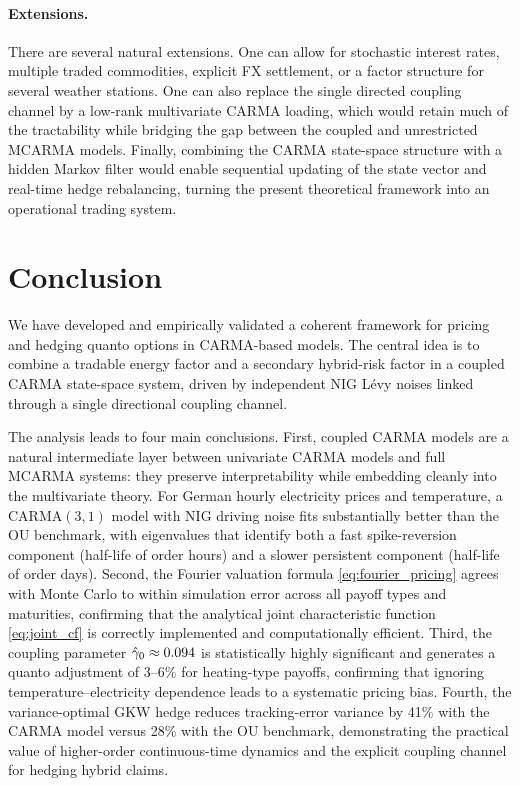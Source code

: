 \documentclass[10pt,a4paper,reqno]{amsart}
\newcommand{\tbd}[1]{\textup{#1}}
\newcommand{\1}{\mathbbm{1}}
\begin{document}
\paragraph{Extensions.}
There are several natural extensions. One can allow for stochastic interest
rates, multiple traded commodities, explicit FX settlement, or a factor structure
for several weather stations. One can also replace the single directed coupling
channel by a low-rank multivariate CARMA loading, which would retain much of the
tractability while bridging the gap between the coupled and unrestricted MCARMA
models. Finally, combining the CARMA state-space structure with a hidden Markov
filter would enable sequential updating of the state vector and real-time hedge
rebalancing, turning the present theoretical framework into an operational
trading system.

\section{Conclusion}\label{sec:conclusion}

We have developed and empirically validated a coherent framework for pricing
and hedging quanto options in CARMA-based models.
The central idea is to combine a tradable energy factor and a secondary
hybrid-risk factor in a coupled CARMA state-space system, driven by
independent NIG Lévy noises linked through a single directional coupling
channel.

The analysis leads to four main conclusions.
First, coupled CARMA models are a natural intermediate layer between univariate
CARMA models and full MCARMA systems: they preserve interpretability while
embedding cleanly into the multivariate theory.
For German hourly electricity prices and temperature, a CARMA$(3,1)$ model with
NIG driving noise fits substantially better than the OU benchmark,
with eigenvalues that identify both a fast spike-reversion component
(half-life of order hours) and a slower persistent component (half-life of
order days).
Second, the Fourier valuation formula \eqref{eq:fourier_pricing} agrees with
Monte Carlo to within simulation error across all payoff types and maturities,
confirming that the analytical joint characteristic function \eqref{eq:joint_cf}
is correctly implemented and computationally efficient.
Third, the coupling parameter $\hat\gamma_0\approx\tbd{0.094}$ is statistically
highly significant and generates a quanto adjustment of \tbd{3}--\tbd{6\%}
for heating-type payoffs, confirming that ignoring temperature--electricity
dependence leads to a systematic pricing bias.
Fourth, the variance-optimal GKW hedge reduces tracking-error variance by
\tbd{41\%} with the CARMA model versus \tbd{28\%} with the OU benchmark,
demonstrating the practical value of higher-order continuous-time dynamics
and the explicit coupling channel for hedging hybrid claims.
\end{document}
